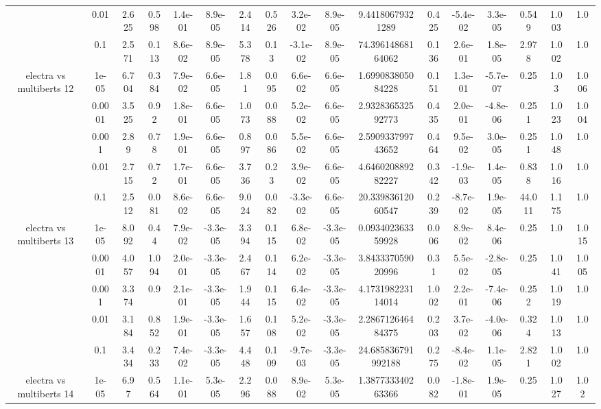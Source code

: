 \begin{tabular}{|c|c|c|c|c|c|c|c|c|c|c|c|c|c|c|c|c|}
 & 0.01 & 2.625 & 0.598 & 1.4e-01 & 8.9e-05 & 2.414 & 0.526 & 3.2e-02 & 8.9e-05 & 9.44180679321289 & 0.425 & -5.4e-02 & 3.3e-05 & 0.549 & 1.003 & 1.0 \\
 & 0.1 & 2.571 & 0.113 & 8.6e-02 & 8.9e-05 & 5.378 & 0.13 & -3.1e-02 & 8.9e-05 & 74.39614868164062 & 0.136 & 2.6e-01 & 1.8e-05 & 2.978 & 1.002 & 1.0 \\
\hline
\multirow{5}{*}{electra  vs multiberts 12} & 1e-05 & 6.704 & 0.384 & 7.9e-02 & 6.6e-05 & 1.81 & 0.095 & 6.6e-02 & 6.6e-05 & 1.699083805084228 & 0.151 & 1.3e-01 & -5.7e-07 & 0.25 & 1.03 & 1.006 \\
 & 0.0001 & 3.525 & 0.92 & 1.8e-01 & 6.6e-05 & 1.073 & 0.088 & 5.2e-02 & 6.6e-05 & 2.932836532592773 & 0.435 & 2.0e-01 & -4.8e-06 & 0.251 & 1.023 & 1.004 \\
 & 0.001 & 2.89 & 0.78 & 1.9e-01 & 6.6e-05 & 0.897 & 0.086 & 5.5e-02 & 6.6e-05 & 2.590933799743652 & 0.464 & 9.5e-02 & 3.0e-05 & 0.251 & 1.048 & 1.0 \\
 & 0.01 & 2.715 & 0.72 & 1.7e-01 & 6.6e-05 & 3.736 & 0.23 & 3.9e-02 & 6.6e-05 & 4.646020889282227 & 0.342 & -1.9e-03 & 1.4e-05 & 0.838 & 1.016 & 1.0 \\
 & 0.1 & 2.512 & 0.081 & 8.6e-02 & 6.6e-05 & 9.024 & 0.082 & -3.3e-02 & 6.6e-05 & 20.33983612060547 & 0.239 & -8.7e-02 & 1.9e-05 & 44.011 & 1.175 & 1.0 \\
\hline
\multirow{5}{*}{electra  vs multiberts 13} & 1e-05 & 8.092 & 0.44 & 7.9e-02 & -3.3e-05 & 3.394 & 0.115 & 6.8e-02 & -3.3e-05 & 0.093402363359928 & 0.006 & 8.9e-02 & 8.4e-06 & 0.25 & 1.0 & 1.015 \\
 & 0.0001 & 4.057 & 1.094 & 2.0e-01 & -3.3e-05 & 2.467 & 0.114 & 6.2e-02 & -3.3e-05 & 3.843337059020996 & 0.31 & 5.5e-02 & -2.8e-05 & 0.25 & 1.041 & 1.005 \\
 & 0.001 & 3.374 & 0.9 & 2.1e-01 & -3.3e-05 & 1.944 & 0.115 & 6.4e-02 & -3.3e-05 & 4.173198223114014 & 1.002 & 2.2e-01 & -7.4e-06 & 0.252 & 1.019 & 1.0 \\
 & 0.01 & 3.184 & 0.852 & 1.9e-01 & -3.3e-05 & 1.657 & 0.108 & 5.2e-02 & -3.3e-05 & 2.286712646484375 & 0.203 & 3.7e-02 & -4.0e-06 & 0.324 & 1.013 & 1.0 \\
 & 0.1 & 3.434 & 0.233 & 7.4e-02 & -3.3e-05 & 4.448 & 0.109 & -9.7e-03 & -3.3e-05 & 24.685836791992188 & 0.275 & -8.4e-02 & 1.1e-05 & 2.821 & 1.002 & 1.0 \\
\hline
\multirow{5}{*}{electra  vs multiberts 14} & 1e-05 & 6.97 & 0.564 & 1.1e-01 & 5.3e-05 & 2.296 & 0.088 & 8.9e-02 & 5.3e-05 & 1.387733340263366 & 0.082 & -1.8e-01 & 1.9e-05 & 0.25 & 1.027 & 1.02 \\

\end{tabular}
